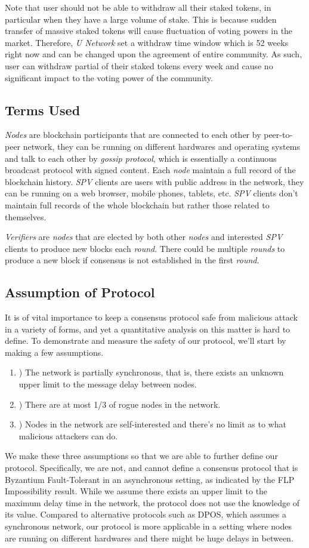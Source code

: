 Note that user should not be able to withdraw all their staked tokens, in particular when they have a large volume of stake. This is because sudden transfer of massive staked tokens will cause fluctuation of voting powers in the market. Therefore, \emph{U Network} set a withdraw time window which is 52 weeks right now and can be changed upon the agreement of entire community. As such, user can withdraw partial of their staked tokens every week and cause no significant impact to the voting power of the community.

\subsection{Terms Used}
    \textit{Nodes} are blockchain participants that are connected to each other by peer-to-peer network, they can be running on different hardwares and operating systems and talk to each other by \textit{gossip protocol}, which is essentially a continuous broadcast protocol with signed content. Each \textit{node} maintain a full record of the blockchain history. \textit{SPV} clients are users with public address in the network, they can be running on a web browser, mobile phones, tablets, etc. \textit{SPV} clients don't maintain full records of the whole blockchain but rather those related to themselves.

    \textit{Verifiers} are \textit{nodes} that are elected by both other \textit{nodes} and interested \textit{SPV} clients to produce new blocks each \textit{round}. There could be multiple \textit{rounds} to produce a new block if consensus is not established in the first \textit{round}.

\subsection{Assumption of Protocol}
    It is of vital importance to keep a consensus protocol safe from malicious attack in a variety of forms, and yet a quantitative analysis on this matter is hard to define. To demonstrate and measure the safety of our protocol, we'll start by making a few assumptions.
\begin{enumerate}
    \item ) The network is partially synchronous, that is, there exists an unknown upper limit to the message delay between nodes.
    \item ) There are at most 1/3 of rogue nodes in the network.
    \item ) Nodes in the network are self-interested and there's no limit as to what malicious attackers can do.
\end{enumerate}
    We make these three assumptions so that we are able to further define our protocol. Specifically, we are not, and cannot define a consensus protocol that is Byzantium Fault-Tolerant in an asynchronous setting, as indicated by the FLP Impossibility result. While we assume there exists an upper limit to the maximum delay time in the network, the protocol does not use the knowledge of its value. Compared to alternative protocols such as DPOS, which assumes a synchronous network, our protocol is more applicable in a setting where nodes are running on different hardwares and there might be huge delays in between.

